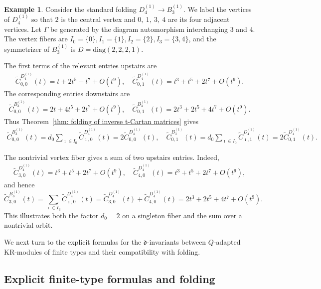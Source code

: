 \documentclass[12pt, leqno]{amsart}
\numberwithin{equation}{section}
\theoremstyle{plain}
\theoremstyle{definition}
\newtheorem{example}[lemma]{Example}
\newcommand{\de}{\mathfrak{d}}
\newcommand{\im}{\imath}
\newcommand{\tC}{\widetilde{C}}
\newcommand{\diag}{\mathrm{diag}}
\begin{document}
\begin{example}\label{ex: affine D4 to B3 inverse t-Cartan folding}
Consider the standard folding
$D_4^{(1)}\longrightarrow B_3^{(1)}$.
We label the vertices of \(D_4^{(1)}\) so that \(2\) is the central
vertex and $0,\ 1,\ 3,\ 4$
are its four adjacent vertices.  Let \(\Gamma\) be generated by the
diagram automorphism interchanging \(3\) and \(4\).  The vertex
fibers are
$I_0=\{0\}, I_1=\{1\}, I_2=\{2\}, I_3=\{3,4\}$,
and the symmetrizer of \(B_3^{(1)}\) is $D=\diag(2,2,2,1).$

The first terms of the relevant entries upstairs are
\[
\begin{aligned}
\tC_{0,0}^{D_4^{(1)}}(t)
= t+2t^5+t^7+O(t^9),\quad
\tC_{0,1}^{D_4^{(1)}}(t)
= t^3+t^5+2t^7+O(t^9).
\end{aligned}
\]
The corresponding entries downstairs are
\[
\begin{aligned}
\tC_{0,0}^{B_3^{(1)}}(t)
=
2t+4t^5+2t^7+O(t^9),\quad
\tC_{0,1}^{B_3^{(1)}}(t)
=
2t^3+2t^5+4t^7+O(t^9).
\end{aligned}
\]
Thus Theorem~\ref{thm: folding of inverse t-Cartan matrices} gives
\[
\begin{aligned}
\tC_{0,0}^{B_3^{(1)}}(t)
=
d_0
\sum_{\im\in I_0}
\tC_{\im,0}^{D_4^{(1)}}(t)
=
2\tC_{0,0}^{D_4^{(1)}}(t),\quad
\tC_{0,1}^{B_3^{(1)}}(t)
=
d_0
\sum_{\im\in I_0}
\tC_{\im,1}^{D_4^{(1)}}(t)
=
2\tC_{0,1}^{D_4^{(1)}}(t).
\end{aligned}
\]

The nontrivial vertex fiber gives a sum of two upstairs entries.  Indeed, 
\[
\begin{aligned}
\tC_{3,0}^{D_4^{(1)}}(t)
=
t^3+t^5+2t^7+O(t^9),\quad
\tC_{4,0}^{D_4^{(1)}}(t)
=
t^3+t^5+2t^7+O(t^9),
\end{aligned}
\]
and hence
\[
\tC_{3,0}^{B_3^{(1)}}(t)
= \sum_{\im\in I_3} \tC_{\im,0}^{D_4^{(1)}}(t)= \tC_{3,0}^{D_4^{(1)}}(t) + \tC_{4,0}^{D_4^{(1)}}(t)
= 2t^3+2t^5+4t^7+O(t^9). 
\]
This illustrates both the factor \(d_0=2\) on a singleton fiber
and the sum over a nontrivial orbit. 
\end{example}

 

We next turn to the explicit formulas for the
\(\de\)-invariants between \(Q\)-adapted KR-modules of finite types and their compatibility with folding.

 

\subsection{Explicit finite-type formulas and folding}
\label{subsec: finite-type formulas and folding}
\end{document}
